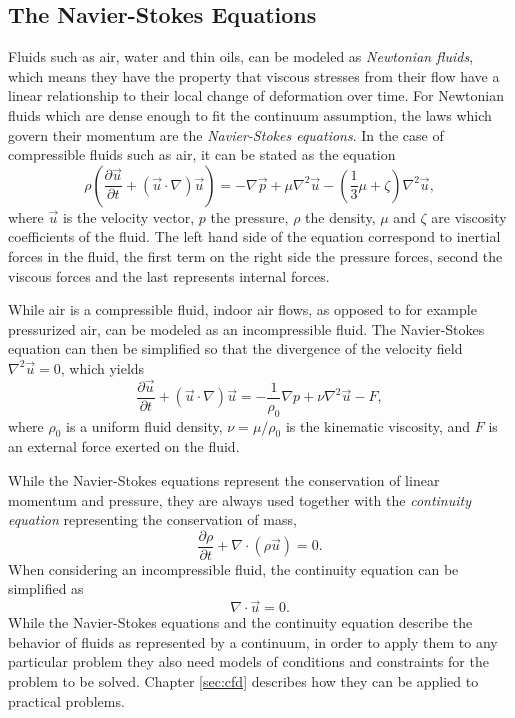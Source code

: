 \subsection{The Navier-Stokes Equations}\label{sec:navier-stokes}
Fluids such as air, water and thin oils, can be modeled as \textit{Newtonian fluids}, which means they have the property that viscous stresses from their flow have a linear relationship to their local change of deformation over time. For Newtonian fluids which are dense enough to fit the continuum assumption, the laws which govern their momentum are the \textit{Navier-Stokes equations}. In the case of compressible fluids such as air, it can be stated as the equation~\cites[pg.46]{elementary}
\begin{equation}
\rho \left( \frac{\partial \vec{u}}{\partial t} + (\vec{u} \cdot \nabla) \vec{u} \right)
=
- \nabla \vec{p}
+ \mu \nabla^2 \vec{u}
- \left( \frac{1}{3} \mu +\zeta \right) \nabla^2 \vec{u},
\end{equation}
where $\vec{u}$ is the velocity vector, $p$ the pressure, $\rho$ the density, $\mu$ and $\zeta$ are viscosity coefficients of the fluid. The left hand side of the equation correspond to inertial forces in the fluid, the first term on the right side the pressure forces, second the viscous forces and the last represents internal forces.

While air is a compressible fluid, indoor air flows, as opposed to for example pressurized air, can be modeled as an incompressible fluid. The Navier-Stokes equation can then be simplified so that the divergence of the velocity field $\nabla^2 \vec{u}=0$, which yields~\cites[pg.47]{elementary}
\begin{equation}
\frac{\partial \vec{u}}{\partial t} + (\vec{u} \cdot \nabla) \vec{u}
=
- \frac{1}{\rho_0} \nabla p
+ \nu \nabla^2 \vec{u}
- F,
\end{equation}
where $\rho_0$ is a uniform fluid density, $\nu = \mu/\rho_0$ is the kinematic viscosity, and $F$ is an external force exerted on the fluid.

While the Navier-Stokes equations represent the conservation of linear momentum and pressure, they are always used together with the \textit{continuity equation} representing the conservation of mass,
\begin{equation}
\frac{\partial \rho}{\partial t} + \nabla \cdot (\rho \vec{u}) = 0.
\end{equation}
When considering an incompressible fluid, the continuity equation can be simplified as
\begin{equation}
\nabla \cdot \vec{u} = 0.
\end{equation}
While the Navier-Stokes equations and the continuity equation describe the behavior of fluids as represented by a continuum, in order to apply them to any particular problem they also need models of conditions and constraints for the problem to be solved. Chapter \ref{sec:cfd} describes how they can be applied to practical problems.
\clearpage

